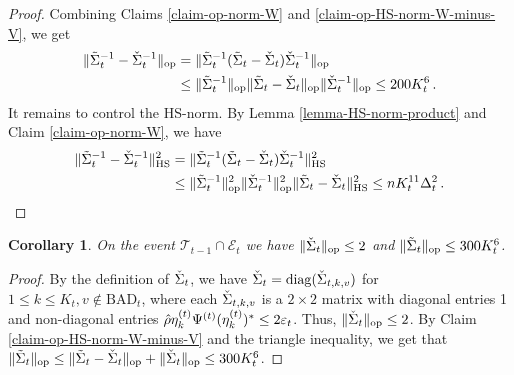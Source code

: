 \documentclass[11pt]{article}
\newtheorem{Corollary}[Theorem]{Corollary}
\numberwithin{equation}{section}
\begin{document}
\begin{proof}
Combining Claims \ref{claim-op-norm-W} and \ref{claim-op-HS-norm-W-minus-V}, we get
\begin{align*}
    \| \Tilde{\Sigma}_{t}^{-1} - \Check{\Sigma}_{t}^{-1} \|_{\mathrm{op}} & = \| \Tilde{\Sigma}_{t}^{-1} (  \Tilde{\Sigma}_{t} - \Check{\Sigma}_{t}  )  \Check{\Sigma}_{t}^{-1} \|_{\mathrm{op}} \\
    & \leq \| \Tilde{\Sigma}_{t}^{-1}  \|_{\mathrm{op}} \| \Tilde{\Sigma}_{t} - \Check{\Sigma}_{t} \|_{\mathrm{op}} \| \Check{\Sigma}_{t}^{-1} \|_{\mathrm{op}} \leq  200 K_{t}^{6} \,.
\end{align*}
It remains to control the HS-norm. By Lemma \ref{lemma-HS-norm-product} and  Claim \ref{claim-op-norm-W}, we have
\begin{align*}
    \| \Tilde{\Sigma}_{t}^{-1} - \Check{\Sigma}_{t}^{-1} \|^2_{\mathrm{HS}} & = \| \Tilde{\Sigma}_{t}^{-1} (  \Tilde{\Sigma}_{t} - \Check{\Sigma}_{t}  )  \Check{\Sigma}_{t}^{-1} \|^2_{\mathrm{HS}} \\
    & \leq \| \Tilde{\Sigma}_{t}^{-1} \|^2_{\mathrm{op}} \| \Check{\Sigma}_{t}^{-1} \|^2_{\mathrm{op}} \|  \Tilde{\Sigma}_{t} - \Check{\Sigma}_{t} \|^2_{\mathrm{HS}} \leq n K_{t}^{11} \Delta_{t}^2 \,. \qedhere
\end{align*}
\end{proof}
\begin{Corollary} {\label{corollary-op-norm-Sigma}}
On the event $\mathcal{T}_{t-1} \cap \mathcal{E}_t$ we have $\| \Check{\Sigma}_t \|_{\mathrm{op}} \leq 2$ and $\| \Tilde{\Sigma}_t \|_{\mathrm{op}} \leq 300 K_t^{6}$.
\end{Corollary}
\begin{proof}
By the definition of $\Check{\Sigma}_t$, we have $\Check{\Sigma}_t = \mathrm{diag}(\Check{\Sigma}_{t,k,v})$ for $1 \leq k \leq K_t, v \not \in \mathrm{BAD}_t$, where each $\Check{\Sigma}_{t,k,v}$ is a  $2\times 2$ matrix with diagonal entries 1 and non-diagonal entries $\Hat{\rho} \eta^{(t)}_k \Psi^{(t)} ( \eta^{(t)}_k )^{*} \leq 2 \varepsilon_t$. Thus, $\| \Check{\Sigma}_t \|_{\mathrm{op}} \leq 2$. By Claim \ref{claim-op-HS-norm-W-minus-V} and the triangle inequality, we get that $\| \Tilde{\Sigma}_t \|_{\mathrm{op}} \leq \| \Tilde{\Sigma}_t - \Check{\Sigma}_t \|_{\mathrm{op}} + \| \Check{\Sigma}_t \|_{\mathrm{op}} \leq 300 K_t^6$.
\end{proof}
\end{document}
